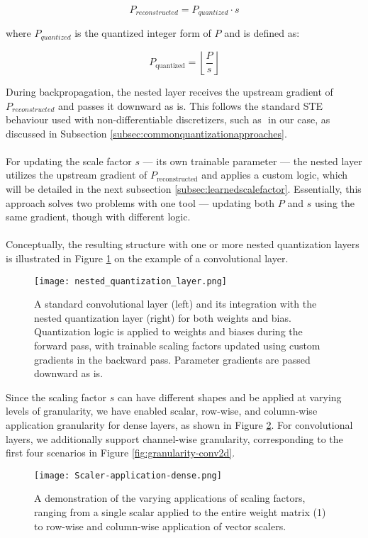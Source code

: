 \[
  P_{reconstructed} = P_{quantized} \cdot s
\]

\noindent where \( P_{quantized} \) is the quantized integer form of \( P \) and is defined as:

\[
  P_{\text{quantized}} = \left\lfloor \frac{P}{s} \right\rfloor
\]

\noindent During backpropagation, the nested layer receives the upstream gradient of
\( P_{reconstructed} \) and passes it downward as is.  This follows the standard STE behaviour
used with non-differentiable discretizers, such as \(  \) in our case,
as discussed in Subsection \ref{subsec:commonquantizationapproaches}.
\\
\\
For updating the scale factor \( s \) — its own trainable parameter — 
the nested layer utilizes the upstream gradient of \( P_{\text{reconstructed}} \)
and applies a custom logic, which will be detailed in the next subsection \ref{subsec:learnedscalefactor}. 
Essentially, this approach solves two problems with one tool — updating both 
\( P \) and \( s \) using the same gradient, though with different logic.
\\
\\
Conceptually, the resulting structure with one or more nested quantization layers is illustrated in Figure \ref{fig:nested_quantization}
on the example of a convolutional layer.
\\
\begin{figure}[h!]
  \centering
  \texttt{[image: nested\_quantization\_layer.png]}
  \caption{A standard convolutional layer (left) and its integration with the nested quantization layer (right) for both weights and bias.
  Quantization logic is applied to weights and biases during the forward pass, with trainable scaling factors 
  updated using custom gradients in the backward pass. Parameter gradients are passed downward as is.}
  \label{fig:nested_quantization}
\end{figure}

\noindent Since the scaling factor \( s \) can have different shapes and be applied at varying levels of granularity,
we have enabled scalar, row-wise, and column-wise application granularity for dense layers,
as shown in Figure \ref{fig:scaler-application-dense}. 
For convolutional layers, we additionally support channel-wise granularity,
corresponding to the first four scenarios in Figure \ref{fig:granularity-conv2d}.
\\
\begin{figure}[h!]
  \centering
  \texttt{[image: Scaler-application-dense.png]}
  \caption{A demonstration of the varying applications of scaling factors, ranging from a single scalar applied to the entire weight matrix (1) to row-wise and column-wise application of vector scalers.}
  \label{fig:scaler-application-dense}
\end{figure}

